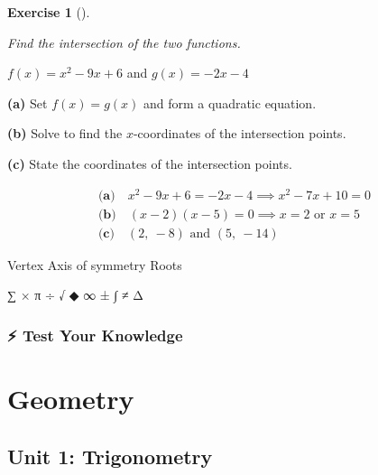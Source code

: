 \documentclass[
  letterpaper,
  DIV=11,
  numbers=noendperiod]{scrreprt}
\theoremstyle{definition}
\newtheorem{exercise}{Exercise}[chapter]
\theoremstyle{remark}
\begin{document}
\begin{exercise}[]\protect\hypertarget{exr-u7-33}{}\label{exr-u7-33}

\emph{Find the intersection of the two functions.}

\(f(x) = x^2 - 9x + 6\) and \(g(x) = -2x - 4\)

\textbf{(a)} Set \(f(x) = g(x)\) and form a quadratic equation.

\textbf{(b)} Solve to find the \(x\)-coordinates of the intersection
points.

\textbf{(c)} State the coordinates of the intersection points.

\begin{tcolorbox}[enhanced jigsaw, opacitybacktitle=0.6, coltitle=black, arc=.35mm, colframe=quarto-callout-tip-color-frame, colback=white, bottomrule=.15mm, left=2mm, colbacktitle=quarto-callout-tip-color!10!white, titlerule=0mm, opacityback=0, title=\textcolor{quarto-callout-tip-color}{\faLightbulb}\hspace{0.5em}{🔍 View Solution}, leftrule=.75mm, breakable, rightrule=.15mm, bottomtitle=1mm, toptitle=1mm, toprule=.15mm]

\[
\begin{aligned}
\textbf{(a)} \quad x^2 - 9x + 6 = -2x - 4 \implies x^2 - 7x + 10 = 0 \\[6pt] \textbf{(b)} \quad (x - 2)(x - 5) = 0 \implies x = 2 \text{ or } x = 5 \\[6pt] \textbf{(c)} \quad (2,\ -8) \text{ and } (5,\ -14)
\end{aligned}
\]

\end{tcolorbox}

{Vertex} {Axis of symmetry} {Roots}

\end{exercise}

∑ × π ÷ √ ◆ ∞ ± ∫ ≠ Δ

\section{⚡ Test Your Knowledge}\label{test-your-knowledge-2}

\part{Geometry}

\chapter{Unit 1: Trigonometry}\label{unit-1-trigonometry}
\end{document}
